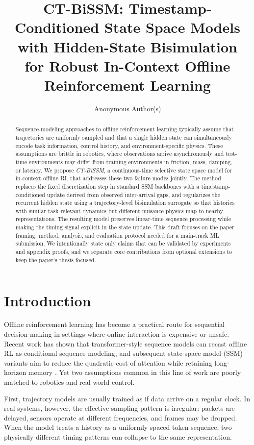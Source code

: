 \documentclass[11pt]{article}
\title{\bfseries CT-BiSSM: Timestamp-Conditioned State Space Models with Hidden-State Bisimulation\\for Robust In-Context Offline Reinforcement Learning}
\author{Anonymous Author(s)}
\date{}
\begin{document}
\maketitle

\begin{abstract}
Sequence-modeling approaches to offline reinforcement learning typically assume that trajectories are uniformly sampled and that a single hidden state can simultaneously encode task information, control history, and environment-specific physics. These assumptions are brittle in robotics, where observations arrive asynchronously and test-time environments may differ from training environments in friction, mass, damping, or latency. We propose \emph{CT-BiSSM}, a continuous-time selective state space model for in-context offline RL that addresses these two failure modes jointly. The method replaces the fixed discretization step in standard SSM backbones with a timestamp-conditioned update derived from observed inter-arrival gaps, and regularizes the recurrent hidden state using a trajectory-level bisimulation surrogate so that histories with similar task-relevant dynamics but different nuisance physics map to nearby representations. The resulting model preserves linear-time sequence processing while making the timing signal explicit in the state update. This draft focuses on the paper framing, method, analysis, and evaluation protocol needed for a main-track ML submission. We intentionally state only claims that can be validated by experiments and appendix proofs, and we separate core contributions from optional extensions to keep the paper's thesis focused.
\end{abstract}

\section{Introduction}

Offline reinforcement learning has become a practical route for sequential decision-making in settings where online interaction is expensive or unsafe. Recent work has shown that transformer-style sequence models can recast offline RL as conditional sequence modeling, and subsequent state space model (SSM) variants aim to reduce the quadratic cost of attention while retaining long-horizon memory \cite{chen2021dt, huang2024dmh}. Yet two assumptions common in this line of work are poorly matched to robotics and real-world control.

First, trajectory models are usually trained as if data arrive on a regular clock. In real systems, however, the effective sampling pattern is irregular: packets are delayed, sensors operate at different frequencies, and frames may be dropped. When the model treats a history as a uniformly spaced token sequence, two physically different timing patterns can collapse to the same representation.
\end{document}
